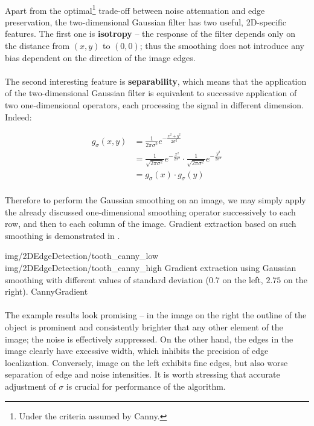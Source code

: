 \paragraph*{}
Apart from the optimal\footnote{Under the criteria assumed by Canny.} trade-off between noise attenuation and edge preservation, the two-dimensional Gaussian filter has two useful, 2D-specific features. The first one is \textbf{isotropy} -- the response of the filter depends only on the distance from $(x,y)$ to $(0,0)$; thus the smoothing does not introduce any bias dependent on the direction of the image edges. 

\paragraph*{}
The second interesting feature is \textbf{separability}, which means that the application of the two-dimensional Gaussian filter is equivalent to successive application of two one-dimensional operators, each processing the signal in different dimension. Indeed:

\begin{align*}
    g_{\sigma}(x,y) &= \frac{1}{2\pi \sigma^2} e^{-\frac{x^2+y^2}{2 \sigma^2}} \\
    				&= \frac{1}{\sqrt{2\pi \sigma^2}} e^{-\frac{x^2}{2 \sigma^2}} \cdot \frac{1}{\sqrt{2\pi \sigma^2}} e^{-\frac{y^2}{2 \sigma^2}} \\
    				&= g_{\sigma}(x)\cdot g_{\sigma}(y)
\end{align*}

\paragraph*{}
Therefore to perform the Gaussian smoothing on an image, we may simply apply the already discussed one-dimensional smoothing operator successively to each row, and then to each column of the image. Gradient extraction based on such smoothing is demonstrated in .

\twoFigures
{img/2DEdgeDetection/tooth_canny_low}
{img/2DEdgeDetection/tooth_canny_high}
{Gradient extraction using Gaussian smoothing with different values of standard deviation ($0.7$ on the left, $2.75$ on the right).}
{CannyGradient}
{\basicWidth}

\paragraph*{}
The example results look promising -- in the image on the right the outline of the object is prominent and consistently brighter that any other element of the image; the noise is effectively suppressed. On the other hand, the edges in the image clearly have excessive width, which inhibits the precision of edge localization. Conversely, image on the left exhibits fine edges, but also worse separation of edge and noise intensities. It is worth stressing that accurate adjustment of $\sigma$ is crucial for performance of the algorithm.

